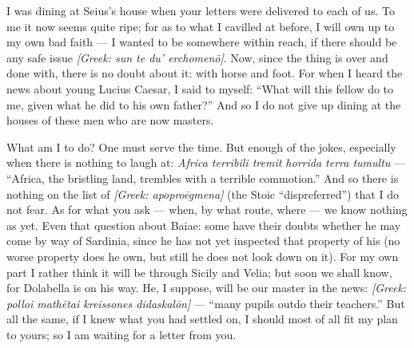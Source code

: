 

 I was dining at Seius's house when your letters were delivered to each of us. To me it now seems quite ripe; for as to what I cavilled at before, I will own up to my own bad faith --- I wanted to be somewhere within reach, if there should be any safe issue \textit{[Greek: sun te du' erchomenō]}. Now, since the thing is over and done with, there is no doubt about it: with horse and foot. For when I heard the news about young Lucius Caesar, I said to myself: ``What will this fellow do to me, given what he did to his own father?'' And so I do not give up dining at the houses of these men who are now masters.

 What am I to do? One must serve the time. But enough of the jokes, especially when there is nothing to laugh at: \textit{Africa terribili tremit horrida terra tumultu} --- ``Africa, the bristling land, trembles with a terrible commotion.'' And so there is nothing on the list of \textit{[Greek: apoproēgmena]} (the Stoic ``dispreferred'') that I do not fear. As for what you ask --- when, by what route, where --- we know nothing as yet. Even that question about Baiae: some have their doubts whether he may come by way of Sardinia, since he has not yet inspected that property of his (no worse property does he own, but still he does not look down on it). For my own part I rather think it will be through Sicily and Velia; but soon we shall know, for Dolabella is on his way. He, I suppose, will be our master in the news: \textit{[Greek: polloi mathētai kreissones didaskalōn]} --- ``many pupils outdo their teachers.'' But all the same, if I knew what you had settled on, I should most of all fit my plan to yours; so I am waiting for a letter from you.

